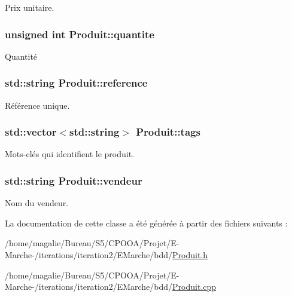 Prix unitaire. 

\hypertarget{class_produit_a6c569e4c47aed9ee050bb0aa9455dd62}{
\subsubsection[{quantite}]{\setlength{\rightskip}{0pt plus 5cm}unsigned int Produit\-::quantite\hspace{0.3cm}{\ttfamily [protected]}}}\label{class_produit_a6c569e4c47aed9ee050bb0aa9455dd62}


Quantité 

\hypertarget{class_produit_a373d0a18812023e675ae981ca9618209}{
\subsubsection[{reference}]{\setlength{\rightskip}{0pt plus 5cm}std\-::string Produit\-::reference\hspace{0.3cm}{\ttfamily [protected]}}}\label{class_produit_a373d0a18812023e675ae981ca9618209}


Référence unique. 

\hypertarget{class_produit_a0fe989b845422996d650da8e5cc09fcf}{
\subsubsection[{tags}]{\setlength{\rightskip}{0pt plus 5cm}std\-::vector$<$std\-::string$>$ Produit\-::tags\hspace{0.3cm}{\ttfamily [protected]}}}\label{class_produit_a0fe989b845422996d650da8e5cc09fcf}


Mots-\/clés qui identifient le produit. 

\hypertarget{class_produit_a176eb59190cd9b761814fd5c68a8353b}{
\subsubsection[{vendeur}]{\setlength{\rightskip}{0pt plus 5cm}std\-::string Produit\-::vendeur\hspace{0.3cm}{\ttfamily [protected]}}}\label{class_produit_a176eb59190cd9b761814fd5c68a8353b}


Nom du vendeur. 



La documentation de cette classe a été générée à partir des fichiers suivants \-:\begin{DoxyCompactItemize}
\item 
/home/magalie/\-Bureau/\-S5/\-C\-P\-O\-O\-A/\-Projet/\-E-\/\-Marche-\//iterations/iteration2/\-E\-Marche/bdd/\hyperlink{_produit_8h}{Produit.\-h}\item 
/home/magalie/\-Bureau/\-S5/\-C\-P\-O\-O\-A/\-Projet/\-E-\/\-Marche-\//iterations/iteration2/\-E\-Marche/bdd/\hyperlink{_produit_8cpp}{Produit.\-cpp}\end{DoxyCompactItemize}
